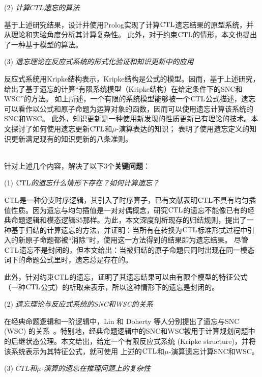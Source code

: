 (2) {\em 计算$CTL$遗忘的算法}

基于上述研究结果，设计并使用Prolog实现了计算$\textrm{CTL}$遗忘结果的原型系统，并从理论和实验角度分析其计算复杂性。
此外，对于约束$\textrm{CTL}$的情形，本文也提出了一种基于模型的算法。

(3) {\em 遗忘理论在反应式系统的形式化验证和知识更新中的应用}

反应式系统用Kripke结构表示，Kripke结构是公式的模型。因而，基于上述研究，
给出了基于遗忘的计算“有限系统模型（Kripke结构）在给定条件下的SNC和WSC”的方法。
如上所述，一个有限的系统模型能够被一个$\textrm{CTL}$公式描述，遗忘可以看作以公式和原子命题为运算对象的函数，因而可以使用遗忘计算该系统的SNC和WSC。
此外，知识更新是一种使用新发现的性质更新已有理论的技术。本文探讨了如何使用遗忘更新$\textrm{CTL}$和$\mu$-演算表达的知识；
表明了使用遗忘定义的知识更新满足现有的知识更新的八条准则。

~\\
针对上述几个内容，解决了以下3个\textbf{关键问题}：

(1) {\em $\textrm{CTL}$的遗忘什么情形下存在？如何计算遗忘？}

$\textrm{CTL}$是一种分支时序逻辑，其引入了时序算子，已有文献表明$\textrm{CTL}$不具有均匀插值性质。因为遗忘与均匀插值是一对对偶概念，研究$\textrm{CTL}$的遗忘不能像已有的经典命题逻辑和模态逻辑S5那样。为此，本文深度剖析现存的归结规则，提出了一种基于归结的计算遗忘的方法，并证明：当所有在转换为$\textrm{CTL}$标准形式过程中引入的新原子命题都被“消除”时，使用这一方法得到的结果即为遗忘结果。
尽管$\textrm{CTL}$遗忘不是封闭的，但本文给出：当被归结的原子命题只同时出现在同一模态词下的命题公式里时，遗忘总是存在的。

此外，针对约束$\textrm{CTL}$的遗忘，证明了其遗忘结果可以由有限个模型的特征公式（一种$\textrm{CTL}$公式）的析取来表示，所以这种情形下的遗忘是封闭的。

(2) {\em 遗忘理论与反应式系统的SNC和WSC的关系}

在经典命题逻辑和一阶逻辑中，Lin 和 Doherty 等人分别提出了遗忘与SNC (WSC) 的关系~\cite{DBLP:journals/ai/Lin01,DBLP:conf/ijcai/DohertyLS01}。特别地，经典命题逻辑中的SNC和WSC被用于计算规划问题中的后继状态公理。本文给出，给定一个有限反应式系统 (Kripke structure)，并将该系统表示为其特征公式，就可使用
上述的$\textrm{CTL}$和$\mu$-演算遗忘计算SNC和WSC。



(3) {\em $CTL$和$\mu$-演算的遗忘在推理问题上的复杂性}

